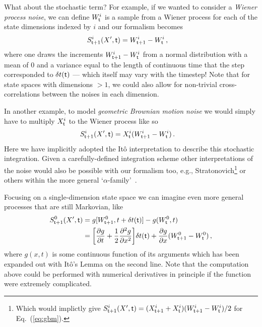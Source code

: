 \documentclass{book}
\begin{document}
What about the stochastic term? For example, if we wanted to consider a \emph{Wiener process noise}, we can define $W^i_{{\sf t}}$ is a sample from a Wiener process for each of the state dimensions indexed by $i$ and our formalism becomes
\begin{align}
& S^{i}_{{\sf t}+1}(X',{\sf t}) =  W^i_{{\sf t}+1}-W^i_{\sf t} \label{eq:wiener}\,,
\end{align}
where one draws the increments $W^i_{{\sf t}+1}-W^i_{\sf t}$ from a normal distribution with a mean of $0$ and a variance equal to the length of continuous time that the step corresponded to $\delta t({\sf t})$ --- which itself may vary with the timestep! Note that for state spaces with dimensions $>1$, we could also allow for non-trivial cross-correlations between the noises in each dimension.

In another example, to model \emph{geometric Brownian motion noise} we would simply have to multiply $X^i_{\sf t}$ to the Wiener process like so
\begin{align}
& S^{i}_{{\sf t}+1}(X',{\sf t}) = X^i_{\sf t}(W^i_{{\sf t}+1}-W^i_{\sf t})\label{eq:gbm} \,.
\end{align}
Here we have implicitly adopted the Itô interpretation to describe this stochastic integration. Given a carefully-defined integration scheme other interpretations of the noise would also be possible with our formalism too, e.g., Stratonovich\footnote{Which would implictly give $S^{i}_{{\sf t}+1}(X',{\sf t}) = (X^i_{{\sf t}+1}+X^i_{\sf t})(W^i_{{\sf t}+1}-W^i_{\sf t}) / 2$ for Eq.~(\ref{eq:gbm}).} or others within the more general `$\alpha$-family'~\cite{van1992stochastic,risken1996fokker,rog-will-2000}.

Focusing on a single-dimension state space we can imagine even more general processes that are still Markovian, like
\begin{align}
S^0_{{\sf t}+1}(X',{\sf t}) &= g[W^0_{{\sf t}+1},t+\delta t({\sf t})]-g(W^0_{\sf t}, t) \\
&= \bigg[ \frac{\partial g}{\partial t} + \frac{1}{2}\frac{\partial^2 g}{\partial x^2} \bigg] \delta t ({\sf t}) + \frac{\partial g}{\partial x} (W^0_{{\sf t}+1}-W^0_{\sf t}) \,,
\end{align}
where $g(x,t)$ is some continuous function of its arguments which has been expanded out with Itô's Lemma on the second line. Note that the computation above could be performed with numerical derivatives in principle if the function were extremely complicated.
\end{document}
